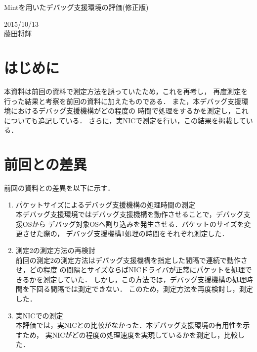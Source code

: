 \documentclass[12pt]{jsarticle}
\begin{document}

\begin{center}
    {\LARGE Mintを用いたデバッグ支援環境の評価(修正版)}
\end{center}

\begin{flushright}
    2015/10/13\\
    藤田将輝
\end{flushright}

\section{はじめに}

本資料は前回の資料で測定方法を誤っていたため，これを再考し，
再度測定を行った結果と考察を前回の資料に加えたものである．
また，本デバッグ支援環境におけるデバッグ支援機構がどの程度の
時間で処理をするかを測定し，これについても追記している．
さらに，実NICで測定を行い，この結果を掲載している．

\section{前回との差異}

前回の資料との差異を以下に示す．
\begin{enumerate}
    \item パケットサイズによるデバッグ支援機構の処理時間の測定\\
        本デバッグ支援環境ではデバッグ支援機構を動作させることで，デバッグ支援OSから
        デバッグ対象OSへ割り込みを発生させる．パケットのサイズを変更させた際の，
        デバッグ支援機構1処理の時間をそれぞれ測定した．
    \item 測定2の測定方法の再検討\\
        前回の測定2の測定方法はデバッグ支援機構を指定した間隔で連続で動作させ，どの程度
        の間隔とサイズならばNICドライバが正常にパケットを処理できるかを測定していた．
        しかし，この方法では，デバッグ支援機構の処理時間を下回る間隔では測定できない．
        このため，測定方法を再度検討し，測定した．
    \item 実NICでの測定\\
        本評価では，実NICとの比較がなかった．本デバッグ支援環境の有用性を示すため，
        実NICがどの程度の処理速度を実現しているかを測定し，比較した．
\end{enumerate}
\end{document}
